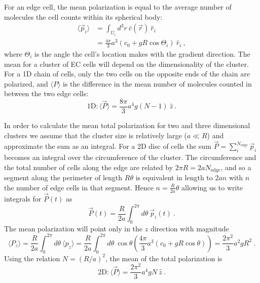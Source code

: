 For an edge cell, the mean polarization is equal to the average number of molecules the cell counts within its spherical body:
\begin{align*}
    \langle \vec{p}_i \rangle &= \int_{U_i} d^3r \ \bar{c}(\vec{r}) \ \hat{r}_i \\
    &= \frac{4\pi}{3}a^3 (c_0+gR\cos\Theta_i) \ \hat{r}_i \ ,
\end{align*}
where $\Theta_i$ is the angle the cell's location makes with the gradient direction. The mean for a cluster of EC cells will depend on the dimensionality of the cluster. For a 1D chain of cells, only the two cells on the opposite ends of the chain are polarized, and $\langle P \rangle$ is the difference in the mean number of molecules counted in between the two edge cells:
\begin{equation} \label{eq:1DECmean}
    \text{1D}: \langle \vec{P} \rangle = \frac{8\pi}{3}a^4g (N-1) \ \hat{z} \ .
\end{equation}

In order to calculate the mean total polarization for two and three dimensional clusters we assume that the cluster size is relatively large ($a\ll R$) and approximate the sum as an integral. For a 2D disc of cells the sum
$\vec{P} = \sum_i^{N_\text{edge}} \vec{p}_i$
becomes an integral over the circumference of the cluster. The circumference and the total number of cells along the edge are related by $2\pi R = 2a N_\text{edge}$, and so a segment along the perimeter of length $R\theta$ is equivalent in length to $2a n$ with $n$ the number of edge cells in that segment. Hence $n =\frac{R}{2a}\theta$ allowing us to write integrals for $\vec{P}(t)$ as
\begin{equation}
    \vec{P}(t) = \frac{R}{2a} \int_0^{2\pi} d\theta \ \vec{p}_i(t) \ .
\end{equation}
The mean polarization will point only in the $z$ direction with magnitude
\begin{equation*}
    \langle P_z \rangle = \frac{R}{2a} \int_0^{2\pi} d\theta \ \langle p_z \rangle = \frac{R}{2a} \int_0^{2\pi} d\theta \ \cos\theta \left( \frac{4\pi}{3}a^3 (c_0+gR\cos\theta) \right) = \frac{2\pi^2}{3} a^2gR^2 \ .
\end{equation*}
Using the relation $N = (R/a)^2$, the mean of the total polarization is
\begin{equation} \label{eq:2DECmean}
    \text{2D}: \langle\vec{P}\rangle = \frac{2\pi^2}{3} a^4gN \ \hat{z} \ .
\end{equation}


